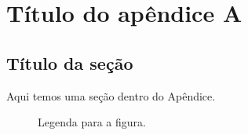 \chapter{Título do apêndice A}\label{apendiceA}

\lipsum[50]

\section{Título da seção}

Aqui temos uma seção dentro do Apêndice.

\begin{figure}
    \begin{center}
        \caption{Legenda para a figura.}
        \label{rotulo1}
    \end{center}
\end{figure}